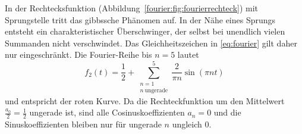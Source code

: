 \begin{beispiel}

In der Rechtecksfunktion (Abbildung~\ref{fourier:fig:fourierrechteck}) mit Sprungstelle tritt das gibbssche Phänomen auf.  
In der Nähe eines Sprungs entsteht ein charakteristischer Überschwinger, der selbst bei unendlich vielen Summanden nicht verschwindet.
Das Gleichheitszeichen in \eqref{eq:fourier} gilt daher nur eingeschränkt.  
Die Fourier-Reihe bis $n=5$ lautet
\begin{equation}
	f_2(t) = \frac{1}{2} + \sum_{\substack{n=1 \\ n\ \text{ungerade}}}^{5} \frac{2}{\pi n} \sin\left( \pi n t \right)
\end{equation}
und entspricht der roten Kurve.  
Da die Rechteckfunktion um den Mittelwert $\frac{a_0}{2}=\frac{1}{2}$ ungerade ist, sind alle Cosinuskoeffizienten $a_n=0$ und die Sinuskoeffizienten bleiben nur für ungerade $n$ ungleich $0$.  



\end{beispiel}






